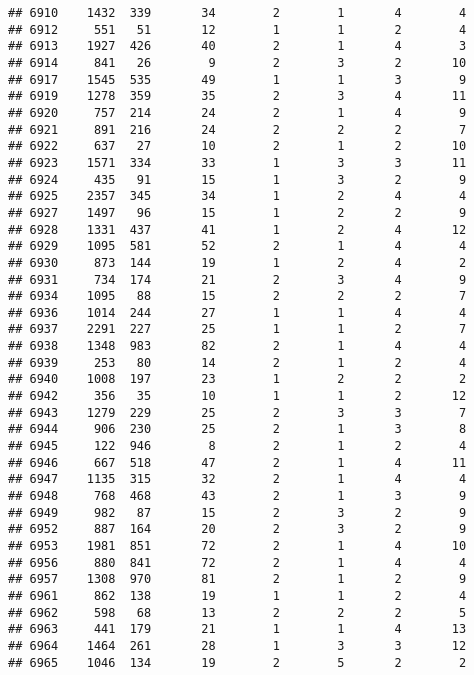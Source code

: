 \documentclass[]{article}
\begin{document}
\begin{verbatim}
## 6910    1432  339       34        2        1       4        4
## 6912     551   51       12        1        1       2        4
## 6913    1927  426       40        2        1       4        3
## 6914     841   26        9        2        3       2       10
## 6917    1545  535       49        1        1       3        9
## 6919    1278  359       35        2        3       4       11
## 6920     757  214       24        2        1       4        9
## 6921     891  216       24        2        2       2        7
## 6922     637   27       10        2        1       2       10
## 6923    1571  334       33        1        3       3       11
## 6924     435   91       15        1        3       2        9
## 6925    2357  345       34        1        2       4        4
## 6927    1497   96       15        1        2       2        9
## 6928    1331  437       41        1        2       4       12
## 6929    1095  581       52        2        1       4        4
## 6930     873  144       19        1        2       4        2
## 6931     734  174       21        2        3       4        9
## 6934    1095   88       15        2        2       2        7
## 6936    1014  244       27        1        1       4        4
## 6937    2291  227       25        1        1       2        7
## 6938    1348  983       82        2        1       4        4
## 6939     253   80       14        2        1       2        4
## 6940    1008  197       23        1        2       2        2
## 6942     356   35       10        1        1       2       12
## 6943    1279  229       25        2        3       3        7
## 6944     906  230       25        2        1       3        8
## 6945     122  946        8        2        1       2        4
## 6946     667  518       47        2        1       4       11
## 6947    1135  315       32        2        1       4        4
## 6948     768  468       43        2        1       3        9
## 6949     982   87       15        2        3       2        9
## 6952     887  164       20        2        3       2        9
## 6953    1981  851       72        2        1       4       10
## 6956     880  841       72        2        1       4        4
## 6957    1308  970       81        2        1       2        9
## 6961     862  138       19        1        1       2        4
## 6962     598   68       13        2        2       2        5
## 6963     441  179       21        1        1       4       13
## 6964    1464  261       28        1        3       3       12
## 6965    1046  134       19        2        5       2        2

\end{verbatim}
\end{document}
